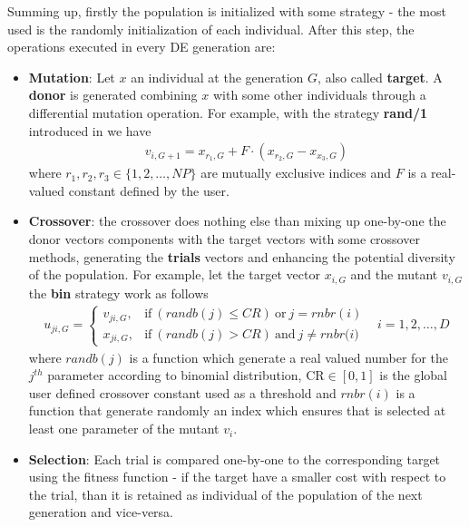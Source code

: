 Summing up, firstly the population is initialized with some strategy - the most used is the randomly initialization of each individual. After this step, the operations executed in every DE generation are:
\begin{itemize}
	\item{\textbf{Mutation}: Let $x$ an individual at the generation $G$, also called \textbf{target}. A \textbf{donor} is generated combining $x$ with some other individuals through a differential mutation operation. For example, with the strategy \textbf{rand/1} introduced in \cite{DESEHGOCS:1997} we have
	\begin{align}
		v_{i,G+1} = x_{r_{1},G} + F\cdot(x_{r_{2},G} - x_{x_{3},G})
	\end{align}
	where $r_{1},r_{2},r_{3} \in \{1,2,\dots,NP\}$ are mutually exclusive indices and $F$ is a real-valued constant defined by the user.}
	\item{\textbf{Crossover}: the crossover does nothing else than mixing up one-by-one the donor vectors components with the target vectors with some crossover methods, generating the \textbf{trials} vectors and enhancing the potential diversity of the population. For example, let the target vector $x_{i,G}$ and the mutant $v_{i,G}$ the \textbf{bin} strategy work as follows
\begin{align}
	u_{ji, G} = \begin{cases}
		v_{ji,G}, & \textrm{if}\ (\textit{randb}(j) \leq \textit{CR})\ \textrm{or}\ j=\textit{rnbr}(i)\\
		x_{ji,G}, & \textrm{if}\ (\textit{randb}(j) > \textit{CR})\ \textrm{and}\ j\neq\textit{rnbr(i)}
	\end{cases} & i=1,2,\dots,D
\end{align}
where  $\textit{randb}(j)$ is a function which generate a real valued number for the $j^{th}$ parameter according to binomial distribution, $\textrm{CR}\in[0,1]$ is the global user defined crossover constant used as a threshold and $\textit{rnbr}(i)$ is a function that generate randomly an index which ensures that is selected at least one parameter of the mutant $v_{i}$.}
	\item{\textbf{Selection}: Each trial is compared one-by-one to the corresponding target using the fitness function - if the target have a smaller cost with respect to the trial, than it is retained as individual of the population of the next generation and vice-versa.}
\end{itemize}


